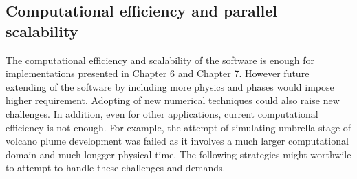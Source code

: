 \subsection{Computational efficiency and parallel scalability}
The computational efficiency and scalability of the software is enough for implementations presented in Chapter 6 and Chapter 7. However future extending of the software by including more physics and phases would impose higher requirement. Adopting of new numerical techniques could also raise new challenges. In addition, even for other applications, current computational efficiency is not enough. For example, the attempt of simulating umbrella stage of volcano plume development was failed as it involves a much larger computational domain and much longger physical time. The following strategies might worthwile to attempt to handle these challenges and demands. 

